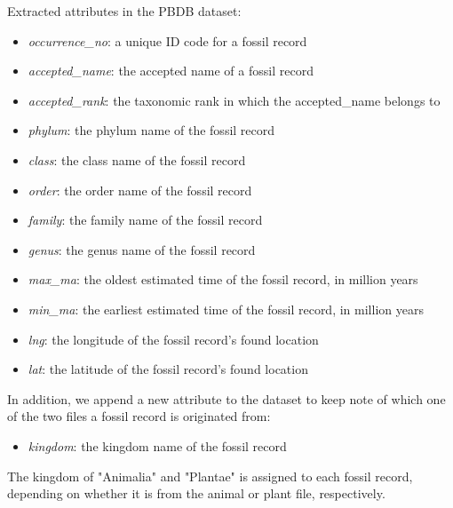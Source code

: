 \documentclass[11pt, a4paper,oneside,chapterprefix=false]{scrbook}
\begin{document}
\noindent Extracted attributes in the PBDB dataset:
\begin{itemize}
	\item \textit{occurrence\_no}: a unique ID code for a fossil record
	\item \textit{accepted\_name}: the accepted name of a fossil record
	\item \textit{accepted\_rank}: the taxonomic rank in which the accepted\_name belongs to 
	\item \textit{phylum}: the phylum name of the fossil record
	\item \textit{class}: the class name of the fossil record
	\item \textit{order}: the order name of the fossil record
	\item \textit{family}: the family name of the fossil record
	\item \textit{genus}: the genus name of the fossil record
	\item \textit{max\_ma}: the oldest estimated time of the fossil record, in million years
	\item \textit{min\_ma}: the earliest estimated time of the fossil record, in million years
	\item \textit{lng}: the longitude of the fossil record's found location 
	\item \textit{lat}: the latitude of the fossil record's found location 
	
\end{itemize}

In addition, we append a new attribute to the dataset to keep note of which one of the two files a fossil record is originated from: 

\begin{itemize}
	\item \textit{kingdom}: the kingdom name of the fossil record	
\end{itemize}

The kingdom of "Animalia" and "Plantae" is assigned to each fossil record, depending on whether it is from the animal or plant file, respectively. \\
\end{document}
